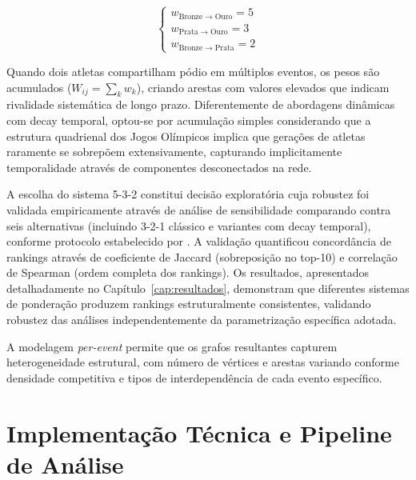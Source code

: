\[
    \begin{cases}
        w_{\mathrm{Bronze} \to \mathrm{Ouro}} = 5 \\
        w_{\mathrm{Prata} \to \mathrm{Ouro}} = 3  \\
        w_{\mathrm{Bronze} \to \mathrm{Prata}} = 2
    \end{cases}
\]

Quando dois atletas compartilham pódio em múltiplos eventos, os pesos são acumulados ($W_{ij} = \sum_{k} w_k$), criando arestas com valores elevados que indicam rivalidade sistemática de longo prazo. Diferentemente de abordagens dinâmicas com decay temporal, optou-se por acumulação simples considerando que a estrutura quadrienal dos Jogos Olímpicos implica que gerações de atletas raramente se sobrepõem extensivamente, capturando implicitamente temporalidade através de componentes desconectados na rede.

A escolha do sistema 5-3-2 constitui decisão exploratória cuja robustez foi validada empiricamente através de análise de sensibilidade comparando contra seis alternativas (incluindo 3-2-1 clássico e variantes com decay temporal), conforme protocolo estabelecido por . A validação quantificou concordância de rankings através de coeficiente de Jaccard (sobreposição no top-10) e correlação de Spearman (ordem completa dos rankings). Os resultados, apresentados detalhadamente no Capítulo~\ref{cap:resultados}, demonstram que diferentes sistemas de ponderação produzem rankings estruturalmente consistentes, validando robustez das análises independentemente da parametrização específica adotada.

A modelagem \textit{per-event} permite que os grafos resultantes capturem heterogeneidade estrutural, com número de vértices e arestas variando conforme densidade competitiva e tipos de interdependência de cada evento específico.

\section{Implementação Técnica e Pipeline de Análise}

